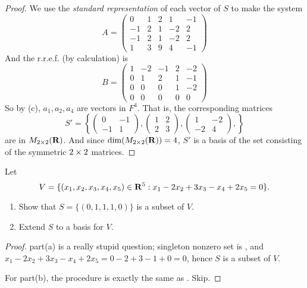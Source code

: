 \begin{proof}
We use the \emph{standard representation} of each vector of \(S\) to make the system
\[
    A = \left(\begin{array}{ccccc}
        0 & 1 & 2 & 1 & -1 \\
        -1 & 2 & 1 & -2 & 2 \\
        -1 & 2 & 1 & -2 & 2 \\
        1 & 3 & 9 & 4 & -1
    \end{array}\right)
\]
And the r.r.e.f. (by calculation) is
\[
    B = \left(\begin{array}{ccccc}
        1 & -2 & -1 & 2 & -2 \\
        0 & 1 & 2 & 1 & -1 \\
        0 & 0 & 0 & 1 & -2 \\
        0 & 0 & 0 & 0 & 0
    \end{array}\right)
\]
So by (c), \(a_1, a_2, a_4\) are \emph{\LID{}} vectors in \(F^4\).
That is, the corresponding matrices
\[
    S' = \left\{
        \left(\begin{array}{rr}
            0 & -1 \\
            -1 & 1
        \end{array}\right),
        \left(\begin{array}{ll}
            1 & 2 \\
            2 & 3
        \end{array}\right),
        \left(\begin{array}{rr}
            1 & -2 \\
            -2 & 4
        \end{array}\right),
    \right\}
\]
are \LID{} in \(M_{2 \times 2}(\mathbf{R})\).
And since \(\dim(M_{2 \times 2}(\mathbf{R})) = 4\), \(S'\) is a basis of the set consisting of the symmetric \(2 \times 2\) matrices.
\end{proof}

\begin{exercise} \label{exercise 3.4.10}
Let
\[
    V = \{(x_1, x_2, x_3, x_4, x_5) \in \mathbf{R}^5 : x_1 - 2x_2 + 3x_3 - x_4 + 2x_5 = 0
 \}.
\]
\begin{enumerate}
\item Show that \(S = \{(0, 1, 1, 1, 0)\}\) is a \LID{} subset of \(V\).
\item Extend \(S\) to a basis for \(V\).
\end{enumerate}
\end{exercise}

\begin{proof}
part(a) is a really stupid question; singleton nonzero set is \LID{}, and \(x_1 - 2x_2 + 3x_3 - x_4 + 2x_5 = 0 - 2 + 3 - 1 + 0 = 0\), hence \(S\) is a \LID{} subset of \(V\).

For part(b), the procedure is exactly the same as . Skip.
\end{proof}

